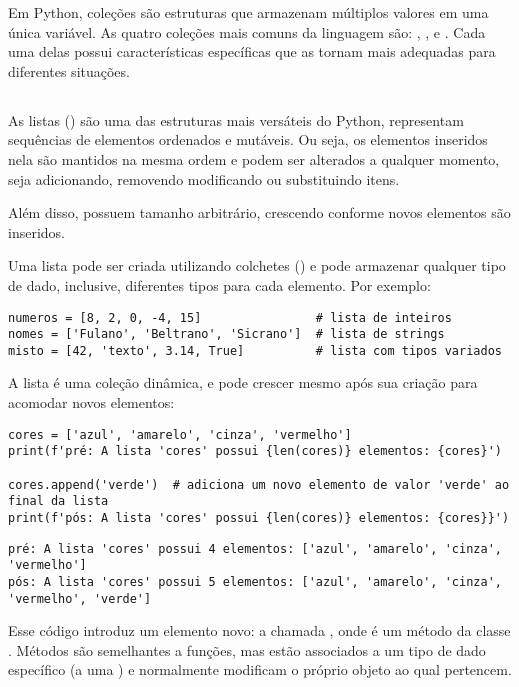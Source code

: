 Em Python, coleções são estruturas que armazenam múltiplos valores em uma única variável.
As quatro coleções mais comuns da linguagem são: , ,  e .
Cada uma delas possui características específicas que as tornam mais adequadas para diferentes situações.



\subsection{}
As listas () são uma das estruturas mais versáteis do Python, representam sequências de elementos
ordenados e mutáveis.
Ou seja, os elementos inseridos nela são mantidos na mesma ordem e podem ser alterados a qualquer momento,
seja adicionando, removendo modificando ou substituindo itens.

Além disso, possuem tamanho arbitrário, crescendo conforme novos elementos são inseridos.

Uma lista pode ser criada utilizando colchetes (\inlcode{[]}) e pode armazenar qualquer tipo de dado, inclusive, diferentes tipos para cada elemento.
Por exemplo:
\begin{verbatim}
numeros = [8, 2, 0, -4, 15]                # lista de inteiros
nomes = ['Fulano', 'Beltrano', 'Sicrano']  # lista de strings
misto = [42, 'texto', 3.14, True]          # lista com tipos variados
\end{verbatim}

A lista é uma coleção dinâmica, e pode crescer mesmo após sua criação para acomodar novos elementos:
\begin{verbatim}
cores = ['azul', 'amarelo', 'cinza', 'vermelho']
print(f'pré: A lista 'cores' possui {len(cores)} elementos: {cores}')

cores.append('verde')  # adiciona um novo elemento de valor 'verde' ao final da lista
print(f'pós: A lista 'cores' possui {len(cores)} elementos: {cores}}')
\end{verbatim}
\begin{verbatim}
pré: A lista 'cores' possui 4 elementos: ['azul', 'amarelo', 'cinza', 'vermelho']
pós: A lista 'cores' possui 5 elementos: ['azul', 'amarelo', 'cinza', 'vermelho', 'verde']
\end{verbatim}

Esse código introduz um elemento novo: a chamada , onde  é um método da classe
.
Métodos são semelhantes a funções, mas estão associados a um tipo de dado específico (a uma ) e
normalmente modificam o próprio objeto ao qual pertencem.

